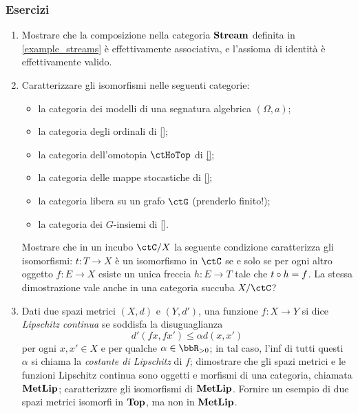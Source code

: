 \subsubsection*{Esercizi}
\begin{enumerate}
	\item Mostrare che la composizione nella categoria \(\mathbf{Stream}\) definita in \ref{example_streams} è effettivamente associativa, e l'assioma di identità è effettivamente valido. %
	\item Caratterizzare gli isomorfismi nelle seguenti categorie:%
	\begin{itemize}
		\item la categoria dei modelli di una segnatura algebrica $(\Omega,a)$;
		\item la categoria degli ordinali di \ref{};
		\item la categoria dell'omotopia $\ctHoTop$ di \ref{};
		\item la categoria delle mappe stocastiche di \ref{};
		\item la categoria libera su un grafo $\ctG$ (prenderlo finito!);
		\item la categoria dei $G$-insiemi di \ref{}.
	\end{itemize}
	Mostrare che in un incubo $\ctC/X$ la seguente condizione caratterizza gli isomorfismi: $t : T\to X$ è un isomorfismo in $\ctC$ se e solo se per ogni altro oggetto $f : E\to X$ esiste un unica freccia $h : E\to T$ tale che $t\circ h=f$. La stessa dimostrazione vale anche in una categoria succuba $X/\ctC$?
	\item Dati due spazi metrici \((X,d)\) e \((Y,d')\), una funzione \(f:X\to Y\) si dice \emph{Lipschitz continua} se soddisfa la disuguaglianza
	      \[
		      d'(fx,fx')\le \alpha d(x,x')
	      \]
	      per ogni \(x,x'\in X\) e per qualche \(\alpha\in\bbR_{>0}\); in tal caso, l'inf di tutti questi \(\alpha\) si chiama la \emph{costante di Lipschitz} di \(f\); dimostrare che gli spazi metrici e le funzioni Lipschitz continua sono oggetti e morfismi di una categoria, chiamata \(\mathbf{MetLip}\); caratterizzre gli isomorfismi di \(\mathbf{MetLip}\). Fornire un esempio di due spazi metrici isomorfi in \(\mathbf{Top}\), ma non in \(\mathbf{MetLip}\).


\end{enumerate}
